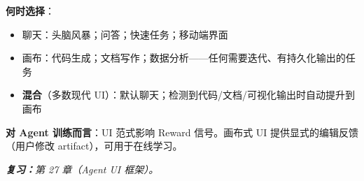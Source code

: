 \begin{questionbox}
\textbf{何时选择}：

\begin{itemize}
  \item 聊天：头脑风暴；问答；快速任务；移动端界面
  \item 画布：代码生成；文档写作；数据分析——任何需要迭代、有持久化输出的任务
  \item \textbf{混合}（多数现代 UI）：默认聊天；检测到代码/文档/可视化输出时自动提升到画布
\end{itemize}

\textbf{对 Agent 训练而言}：UI 范式影响 Reward 信号。画布式 UI 提供显式的编辑反馈（用户修改 artifact），可用于在线学习。

\emph{\textbf{复习：}第 27 章（Agent UI 框架）。}
\end{questionbox}

